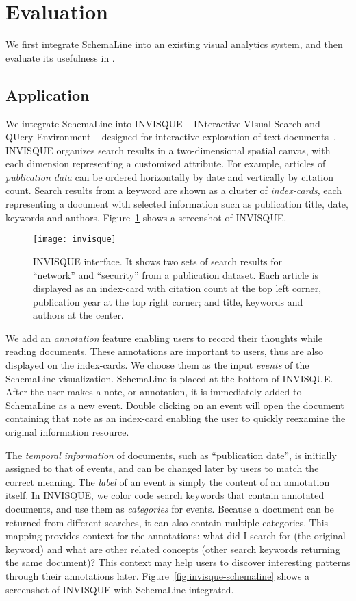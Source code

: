 \section{Evaluation}
We first integrate SchemaLine into an existing visual analytics system, and then evaluate its usefulness in .

\subsection{Application}
We integrate SchemaLine into INVISQUE -- INteractive VIsual Search and QUery Environment -- designed for interactive exploration of text documents~\cite{Wong2011}. INVISQUE organizes search results in a two-dimensional spatial canvas, with each dimension representing a customized attribute. For example, articles of \emph{publication data} can be ordered horizontally by date and vertically by citation count. Search results from a keyword are shown as a cluster of \emph{index-cards}, each representing a document with selected information such as publication title, date, keywords and authors. Figure~\ref{fig:invisque} shows a screenshot of INVISQUE.

\begin{figure}[!htb]
	\centering
	\texttt{[image: invisque]}
	\caption{INVISQUE interface. It shows two sets of search results for ``network'' and ``security'' from a publication dataset. Each article is displayed as an index-card with citation count at the top left corner, publication year at the top right corner; and title, keywords and authors at the center.}
	\label{fig:invisque}
\end{figure}

We add an \emph{annotation} feature enabling users to record their thoughts while reading documents. These annotations are important to users, thus are also displayed on the index-cards. We choose them as the input \emph{events} of the SchemaLine visualization. SchemaLine is placed at the bottom of INVISQUE.
After the user makes a note, or annotation, it is immediately added to SchemaLine as a new event. Double clicking on an event will open the document containing that note as an index-card enabling the user to quickly reexamine the original information resource.

The \emph{temporal information} of documents, such as ``publication date'', is initially assigned to that of events, and can be changed later by users to match the correct meaning. The \emph{label} of an event is simply the content of an annotation itself. In INVISQUE, we color code search keywords that contain annotated documents, and use them as \emph{categories} for events. Because a document can be returned from different searches, it can also contain multiple categories. This mapping provides context for the annotations: what did I search for (the original keyword) and what are other related concepts (other search keywords returning the same document)? This context may help users to discover interesting patterns through their annotations later. Figure~\ref{fig:invisque-schemaline} shows a screenshot of INVISQUE with SchemaLine integrated.

